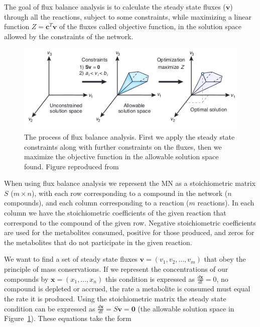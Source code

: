 \documentclass[a4paper,12pt]{article}
\begin{document}
	The goal of flux balance analysis is to calculate the steady state fluxes ($\mathbf{v}$) through all the reactions, subject to some constraints, while maximizing a linear function $Z=\mathbf{c}^T \mathbf{v}$ of the fluxes called objective function, in the solution space allowed by the constraints of the network.

	\begin{figure}[htpb]
		\centering
		\includegraphics[width=0.8\linewidth]{fba_frompaper.png}
		\caption{The process of flux balance analysis. First we apply the steady state constraints along with further constraints on the fluxes, then we maximize the objective function in the allowable solution space found. Figure reproduced from \cite[]{whatisfluxbalance} }
		\label{fig:fluxbalance}
	\end{figure}

	When using flux balance analysis we represent the MN as a stoichiometric matrix $S$ ($m\times n$), with each row corresponding to a compound in the network ($n$ compounds), and each column corresponding to a reaction ($m$ reactions). In each column we have the stoichiometric coefficients of the given reaction that correspond to the compound of the given row. Negative stoichiometric coefficients are used for the metabolites consumed, positive for those produced, and zeros for the metabolites that do not participate in the given reaction.
	
	We want to find a set of steady state fluxes $\mathbf{v}=\left( v_1,v_2,...,v_m \right)$ that obey the principle of mass conservations. If we represent the concentrations of our compounds by ${\mathbf{x}=\left( x_1, ... , x_n \right)}$ this condition is expressed as $\frac{d\mathbf{x}}{dt}=0$, no compound is depleted or accrued, the rate a metabolite is consumed must equal the rate it is produced. Using the stoichiometric matrix the steady state condition can be expressed as $\frac{d\mathbf{x}}{dt}= S\mathbf{v}=\mathbf{0}$ (the allowable solution space in Figure~\ref{fig:fluxbalance}). These equations take the form
	
\end{document}

